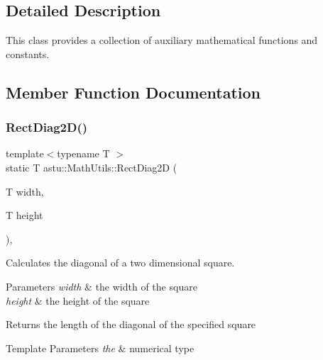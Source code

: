 \subsection{Detailed Description}
This class provides a collection of auxiliary mathematical functions and constants. 

\subsection{Member Function Documentation}
\mbox{\label{classastu_1_1MathUtils_af1b78d1d769e7f46ff0e819ac11b269b}} 
\subsubsection{\texorpdfstring{Rect\+Diag2\+D()}{RectDiag2D()}}
{\footnotesize\ttfamily template$<$typename T $>$ \\
static T astu\+::\+Math\+Utils\+::\+Rect\+Diag2D (\begin{DoxyParamCaption}\item[{T}]{width,  }\item[{T}]{height }\end{DoxyParamCaption})\hspace{0.3cm}{\ttfamily [inline]}, {\ttfamily [static]}}

Calculates the diagonal of a two dimensional square.


\begin{DoxyParams}{Parameters}
{\em width} & the width of the square \\
\hline
{\em height} & the height of the square \\
\hline
\end{DoxyParams}
\begin{DoxyReturn}{Returns}
the length of the diagonal of the specified square 
\end{DoxyReturn}

\begin{DoxyTemplParams}{Template Parameters}
{\em the} & numerical type \\
\hline
\end{DoxyTemplParams}
\mbox{\label{classastu_1_1MathUtils_a635ccbb17b8e6ee4333ff8391b328ee0}} 
